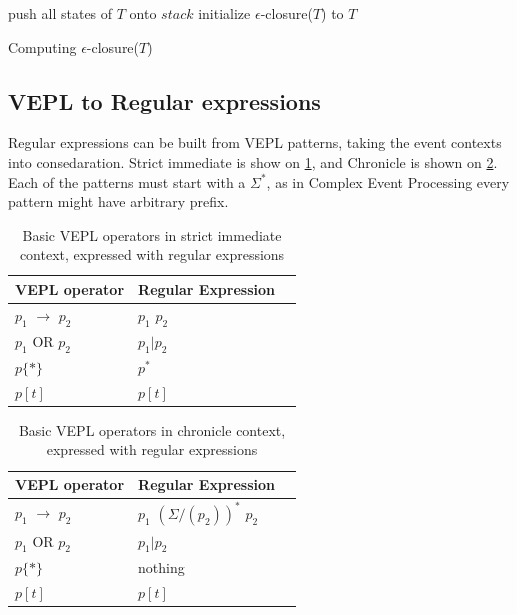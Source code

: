 			\begin{algorithm}
			\SetAlgoLined
			push all states of $T$ onto $\mathit{stack}$\;
			initialize $\epsilon$-closure($T$) to $T$\;
			\caption{Computing $\epsilon$-closure($T$)}
			\end{algorithm}

	\subsection{VEPL to Regular expressions}
		Regular expressions can be built from VEPL patterns, taking the event contexts into consedaration.
		Strict immediate is show on \cref{tab:cep:vepl_regex_strict}, and Chronicle is shown on \cref{tab:cep:vepl_regex_chronicle}.
		Each of the patterns must start with a $\Sigma^*$, as in Complex Event Processing every pattern might have arbitrary prefix.


		\begin{table}
		\caption{Basic VEPL operators in strict immediate context, expressed with regular expressions}		
		\label{tab:cep:vepl_regex_strict}
			\begin{tabularx}{0.5\textwidth}{llX}
				\toprule
				VEPL operator &	Regular Expression \\
				\midrule
				$p_1$ $\rightarrow$ $p_2$ & $p_1$ $p_2$ \\
				$p_1$ OR $p_2$ & $p_1|p_2$ \\
				$p\{\ast\}$ & $p^*$ \\
				$p[t]$ & $p[t]$ \\ 
				\bottomrule
			\end{tabularx}
		\end{table}

		\begin{table}
		\caption{Basic VEPL operators in chronicle context, expressed with regular expressions}		
		\label{tab:cep:vepl_regex_chronicle}
			\begin{tabularx}{0.5\textwidth}{llX}
				\toprule
				VEPL operator &	Regular Expression \\
				\midrule
				$p_1$ $\rightarrow$ $p_2$ & $p_1$ $(\Sigma/(p_2))^*$ $p_2$ \\
				$p_1$ OR $p_2$ & $p_1|p_2$ \\
				$p\{\ast\}$ & nothing\\
				$p[t]$ & $p[t]$ \\
				\bottomrule
			\end{tabularx}
		\end{table}
	
	